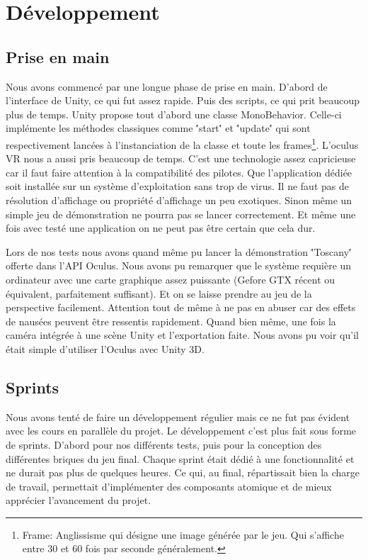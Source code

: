 \documentclass[a4paper,11pt]{myreport}
\begin{document}
\section{Développement}
\subsection{Prise en main}

\par Nous avons commencé par une longue phase de prise en main. D'abord de l'interface de Unity, ce qui fut assez rapide. Puis des scripts, ce qui prit beaucoup plus de temps.
Unity propose tout d'abord une classe MonoBehavior. Celle-ci implémente les méthodes classiques comme \''start\'' et \''update\'' qui sont respectivement lancées à l'instanciation de la classe et toute les frames\footnote{Frame: Anglissisme qui désigne une image générée par le jeu. Qui s'affiche entre 30 et 60 fois par seconde généralement.}. 
L'oculus VR nous a aussi pris beaucoup de temps. C'est une technologie assez capricieuse car il faut faire attention à la compatibilité des pilotes. Que l'application dédiée soit installée sur un système d'exploitation sans trop de virus. Il ne faut pas de résolution d'affichage ou propriété d'affichage un peu exotiques. Sinon même un simple jeu de démonstration ne pourra pas se lancer correctement.
Et même une fois avec testé une application on ne peut pas être certain que cela dur.
\par Lors de nos tests nous avons quand même pu lancer la démonstration \''Toscany\'' offerte dans l'API Oculus. Nous avons pu remarquer que le système requière un ordinateur avec une carte graphique assez puissante (Gefore GTX récent ou équivalent, parfaitement suffisant). Et on se laisse prendre au jeu de la perspective facilement. Attention tout de même à ne pas en abuser car des effets de nausées peuvent être ressentis rapidement. 
Quand bien même, une fois la caméra intégrée à une scène Unity et l'exportation faite. Nous avons pu voir qu'il était simple d'utiliser l'Oculus avec Unity 3D.
\subsection{Sprints}
\par Nous avons tenté de faire un développement régulier mais ce ne fut pas évident avec les cours en parallèle du projet. Le développement c'est plus fait sous forme de sprints.
D'abord pour nos différents tests, puis pour la conception des différentes briques du jeu final.
Chaque sprint était dédié à une fonctionnalité et ne durait pas plus de quelques heures. Ce qui, au final, répartissait bien la charge de travail, permettait d'implémenter des composants atomique et de mieux apprécier  l'avancement du projet.
\end{document}
